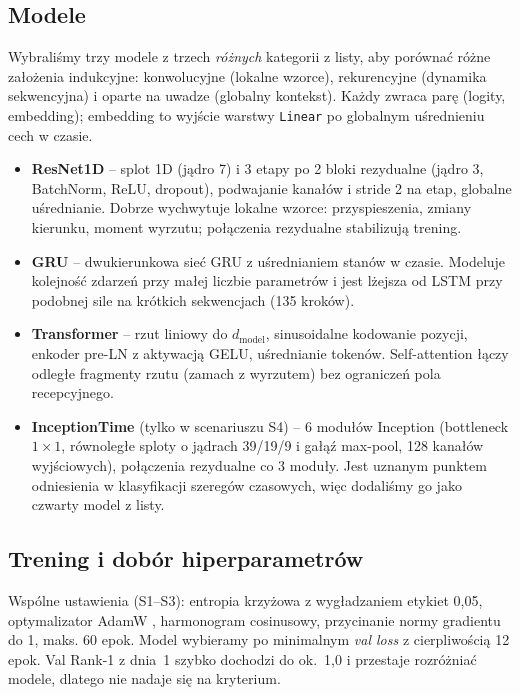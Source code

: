 \documentclass[11pt,a4paper]{article}
\newcommand{\code}[1]{\texttt{#1}}
\begin{document}
\subsection{Modele}\label{sec:modele}
Wybraliśmy trzy modele z trzech \emph{różnych} kategorii z listy, aby porównać różne założenia
indukcyjne: konwolucyjne (lokalne wzorce), rekurencyjne (dynamika sekwencyjna) i oparte na uwadze
(globalny kontekst). Każdy zwraca parę (logity, embedding); embedding to wyjście warstwy
\code{Linear} po globalnym uśrednieniu cech w czasie.
\begin{itemize}
  \item \textbf{ResNet1D} \cite{resnet} -- splot 1D (jądro 7) i 3 etapy po 2 bloki rezydualne
        (jądro 3, BatchNorm, ReLU, dropout), podwajanie kanałów i stride 2 na etap, globalne
        uśrednianie. Dobrze wychwytuje lokalne wzorce: przyspieszenia, zmiany kierunku, moment
        wyrzutu; połączenia rezydualne stabilizują trening.
  \item \textbf{GRU} \cite{gru} -- dwukierunkowa sieć GRU z uśrednianiem stanów w czasie. Modeluje
        kolejność zdarzeń przy małej liczbie parametrów i jest lżejsza od LSTM przy podobnej sile na
        krótkich sekwencjach (135 kroków).
  \item \textbf{Transformer} \cite{transformer} -- rzut liniowy do $d_\text{model}$, sinusoidalne
        kodowanie pozycji, enkoder pre-LN z aktywacją GELU, uśrednianie tokenów. Self-attention łączy
        odległe fragmenty rzutu (zamach z wyrzutem) bez ograniczeń pola recepcyjnego.
  \item \textbf{InceptionTime} \cite{inceptiontime} (tylko w scenariuszu S4) -- 6 modułów Inception
        (bottleneck $1\times1$, równoległe sploty o jądrach 39/19/9 i gałąź max-pool, 128 kanałów
        wyjściowych), połączenia rezydualne co 3 moduły. Jest uznanym punktem odniesienia w
        klasyfikacji szeregów czasowych, więc dodaliśmy go jako czwarty model z listy.
\end{itemize}

\subsection{Trening i dobór hiperparametrów}\label{sec:trening}
Wspólne ustawienia (S1--S3): entropia krzyżowa z wygładzaniem etykiet 0{,}05, optymalizator AdamW
\cite{adamw}, harmonogram cosinusowy, przycinanie normy gradientu do 1, maks. 60 epok. Model
wybieramy po minimalnym \emph{val loss} z cierpliwością 12 epok. Val Rank-1 z dnia~1 szybko dochodzi
do ok.~1{,}0 i przestaje rozróżniać modele, dlatego nie nadaje się na kryterium.
\end{document}
